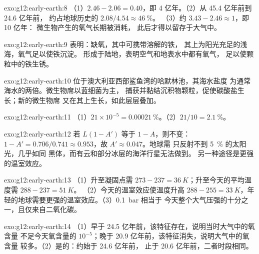 \begin{solution}{exo:g12:early-earth:8}
（1）$2.46 - 2.06 = 0.40$，即 4 亿年。（2）从 45.4 亿年前到 24.6 亿年前，
约占地球历史的 $2.08/4.54 \approx \qty{46}{\percent}$。
（3）约 $3.43 - 2.46 \approx 1$，即 10 亿年：
微生物产生的氧气长期被消耗，
此后才得以留存于大气中。
\end{solution}

\begin{solution}{exo:g12:early-earth:9}
表明：缺氧，其中可携带溶解的铁，
其上为阳光充足的浅海，氧气足以使铁沉淀。
形成于陆地，表明空气和地表水中都有氧气，
足以使颗粒中的铁生锈。
\end{solution}

\begin{solution}{exo:g12:early-earth:10}
位于澳大利亚西部鲨鱼湾的哈默林池，其海水盐度
为通常海水的两倍。微生物席以蓝细菌为主，
捕获并黏结沉积物颗粒，促使碳酸盐生长；新的微生物席
又在其上生长，如此层层叠加。
\end{solution}

\begin{solution}{exo:g12:early-earth:11}
（1）$21 \times 10^{-5} = \qty{0.00021}{\percent}$。（2）$21/10 =
\qty{2.1}{\percent}$。
\end{solution}

\begin{solution}{exo:g12:early-earth:12}
若 $L(1 - A')$ 等于 $1 - A$，则不变：
$1 - A' = 0.706/0.741 \approx 0.953$，故 $A' \approx 0.047$。地球需
只反射不到 \qty{5}{\percent} 的太阳光，几乎如同
黑体，而有云和部分冰层的海洋行星无法做到。
另一种途径是更强的温室效应。
\end{solution}

\begin{solution}{exo:g12:early-earth:13}
（1）升至凝固点需 $273 - 237 = \qty{36}{K}$；升至今天的平均温度需 $288 - 237 = \qty{51}{K}$。
（2）今天的温室效应使温度升高 $288 - 255 =
\qty{33}{K}$，年轻的地球需要更强的温室效应。（3）\qty{0.1}{bar} 相当于
今天整个大气压强的十分之一，且仅来自二氧化碳。
\end{solution}

\begin{solution}{exo:g12:early-earth:14}
（1）早于 24.5 亿年前，该特征存在，说明当时大气中的氧含量
不足今天氧含量的 $10^{-5}$；晚于 20.9 亿年前，该特征消失，说明大气中的氧含量
较多。（2）是的：约始于 24.6 亿年前，
止于 20.6 亿年前，二者时段相同。
\end{solution}

